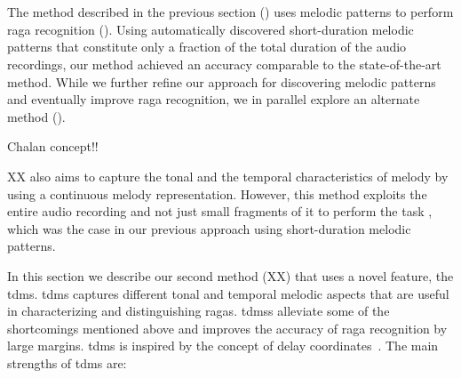 %













\section{}
\label{sec:tdms_raga_recognition}

The method described in the previous section () uses melodic patterns to perform \gls{raga} recognition (). Using automatically discovered short-duration melodic patterns that constitute only a fraction of the total duration of the audio recordings, our method achieved an accuracy comparable to the state-of-the-art method. While we further refine our approach for discovering melodic patterns and eventually improve \gls{raga} recognition, we in parallel explore an alternate method (). 

Chalan concept!!

XX also aims to capture the tonal and the temporal characteristics of melody by using a continuous melody representation. However, this method exploits the entire audio recording and not just small fragments of it to perform the task , which was the case in our previous approach using short-duration melodic patterns. 

In this section we describe our second method (XX) that uses a novel feature, the \gls{tdms}.  \gls{tdms} captures different tonal and temporal melodic aspects that are useful in characterizing and distinguishing \glspl{raga}. \Glspl{tdms} alleviate some of the shortcomings mentioned above and improves the accuracy of \gls{raga} recognition by large margins. \Gls{tdms} is inspired by the concept of delay coordinates~. The main strengths of \gls{tdms} are:

